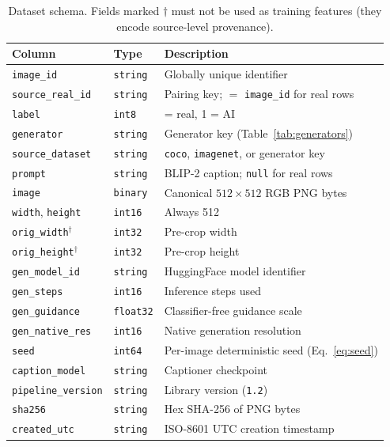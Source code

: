 \begin{table}[t]
\centering
\caption{Dataset schema. Fields marked $\dagger$ must not be used as
training features (they encode source-level provenance).}
\label{tab:schema}
\footnotesize
\setlength{\tabcolsep}{4pt}
\begin{tabular}{@{}>{\raggedright\arraybackslash}p{2.5cm}l>{\raggedright\arraybackslash}p{3.4cm}@{}}
\toprule
Column & Type & Description \\
\midrule
\texttt{image\_id} & \texttt{string} & Globally unique identifier \\
\texttt{source\_real\_id} & \texttt{string} & Pairing key; $=$ \texttt{image\_id} for real rows \\
\texttt{label} & \texttt{int8} & 0 = real, 1 = AI \\
\texttt{generator} & \texttt{string} & Generator key (Table~\ref{tab:generators}) \\
\texttt{source\_dataset} & \texttt{string} & \texttt{coco}, \texttt{imagenet}, or generator key \\
\texttt{prompt} & \texttt{string} & BLIP-2 caption; \texttt{null} for real rows \\
\texttt{image} & \texttt{binary} & Canonical $512\!\times\!512$ RGB PNG bytes \\
\texttt{width}, \texttt{height} & \texttt{int16} & Always 512 \\
\texttt{orig\_width}$^\dagger$ & \texttt{int32} & Pre-crop width \\
\texttt{orig\_height}$^\dagger$ & \texttt{int32} & Pre-crop height \\
\texttt{gen\_model\_id} & \texttt{string} & HuggingFace model identifier \\
\texttt{gen\_steps} & \texttt{int16} & Inference steps used \\
\texttt{gen\_guidance} & \texttt{float32} & Classifier-free guidance scale \\
\texttt{gen\_native\_res} & \texttt{int16} & Native generation resolution \\
\texttt{seed} & \texttt{int64} & Per-image deterministic seed (Eq.~\ref{eq:seed}) \\
\texttt{caption\_model} & \texttt{string} & Captioner checkpoint \\
\texttt{pipeline\_version} & \texttt{string} & Library version (\texttt{1.2}) \\
\texttt{sha256} & \texttt{string} & Hex SHA-256 of PNG bytes \\
\texttt{created\_utc} & \texttt{string} & ISO-8601 UTC creation timestamp \\
\bottomrule
\end{tabular}
\end{table}

